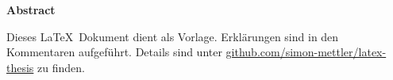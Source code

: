 
{\noindent\huge\bfseries Abstract \\} 

\noindent 
Dieses \LaTeX\  Dokument dient als Vorlage. Erklärungen sind in den Kommentaren aufgeführt. 
Details sind unter \href{https://github.com/simon-mettler/latex-thesis}{github.com/simon-mettler/latex-thesis} zu finden.

\newpage